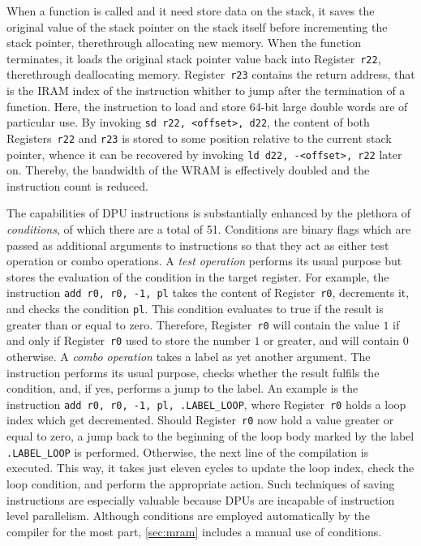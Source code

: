 When a function is called and it need store data on the stack, it saves the original value of the stack pointer on the stack itself before incrementing the stack pointer, therethrough allocating new memory.
When the function terminates, it loads the original stack pointer value back into Register~\lstinline|r22|, therethrough deallocating memory.
Register~\lstinline|r23| contains the return address, that is the \ac{IRAM} index of the instruction whither to jump after the termination of a function.
Here, the instruction to load and store 64-bit large double words are of particular use.
By invoking \lstinline|sd r22, <offset>, d22|, the content of both Registers~\lstinline|r22| and \lstinline|r23| is stored to some position relative to the current stack pointer, whence it can be recovered by invoking \lstinline|ld d22, -<offset>, r22| later on.
Thereby, the bandwidth of the \ac{WRAM} is effectively doubled and the instruction count is reduced.

The capabilities of \ac{DPU} instructions is substantially enhanced by the plethora of \emph{conditions}, of which there are a total of 51.
Conditions are binary flags which are passed as additional arguments to instructions so that they act as either test operation or combo operations.
A \emph{test operation} performs its usual purpose but stores the evaluation of the condition in the target register.
For example, the instruction \lstinline|add r0, r0, -1, pl| takes the content of Register~\lstinline|r0|, decrements it, and checks the condition \lstinline|pl|.
This condition evaluates to true if the result is greater than or equal to zero.
Therefore, Register~\lstinline|r0| will contain the value \(1\) if and only if Register~\lstinline|r0| used to store the number \(1\) or greater, and will contain \(0\) otherwise.
A \emph{combo operation} takes a label as yet another argument.
The instruction performs its usual purpose, checks whether the result fulfils the condition, and, if yes, performs a jump to the label.
An example is the instruction \lstinline|add r0, r0, -1, pl, .LABEL_LOOP|, where Register~\lstinline|r0| holds a loop index which get decremented.
Should Register~\lstinline|r0| now hold a value greater or equal to zero, a jump back to the beginning of the loop body marked by the label \lstinline|.LABEL_LOOP| is performed.
Otherwise, the next line of the compilation is executed.
This way, it takes just eleven cycles to update the loop index, check the loop condition, and perform the appropriate action.
Such techniques of saving instructions are especially valuable because \acp{DPU} are incapable of instruction level parallelism.
Although conditions are employed automatically by the compiler for the most part, \cref{sec:mram} includes a manual use of conditions.
